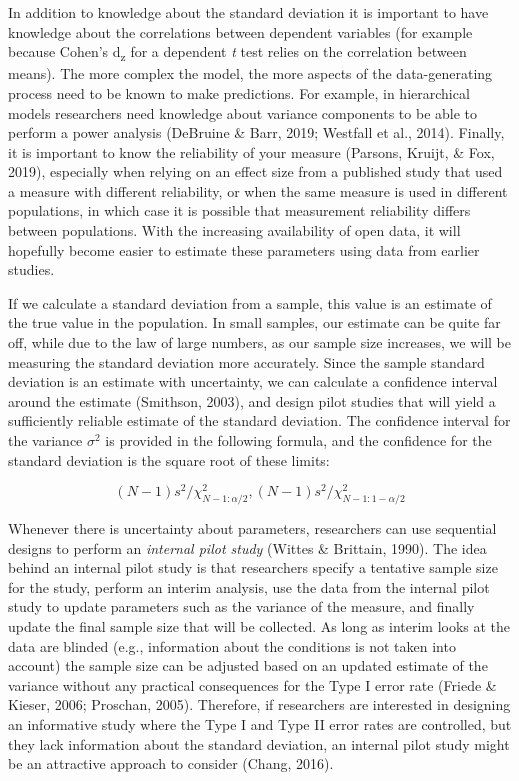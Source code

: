 \documentclass[
  english,
  ,jou, a4paper,floatsintext]{apa6}
\begin{document}
In addition to knowledge about the standard deviation it is important to have knowledge about the correlations between dependent variables (for example because Cohen's d\textsubscript{z} for a dependent \emph{t} test relies on the correlation between means). The more complex the model, the more aspects of the data-generating process need to be known to make predictions. For example, in hierarchical models researchers need knowledge about variance components to be able to perform a power analysis (DeBruine \& Barr, 2019; Westfall et al., 2014). Finally, it is important to know the reliability of your measure (Parsons, Kruijt, \& Fox, 2019), especially when relying on an effect size from a published study that used a measure with different reliability, or when the same measure is used in different populations, in which case it is possible that measurement reliability differs between populations. With the increasing availability of open data, it will hopefully become easier to estimate these parameters using data from earlier studies.

If we calculate a standard deviation from a sample, this value is an estimate of the true value in the population. In small samples, our estimate can be quite far off, while due to the law of large numbers, as our sample size increases, we will be measuring the standard deviation more accurately. Since the sample standard deviation is an estimate with uncertainty, we can calculate a confidence interval around the estimate (Smithson, 2003), and design pilot studies that will yield a sufficiently reliable estimate of the standard deviation. The confidence interval for the variance \(\sigma^2\) is provided in the following formula, and the confidence for the standard deviation is the square root of these limits:

\[(N - 1)s^2/\chi^2_{N-1:\alpha/2},(N - 1)s^2/\chi^2_{N-1:1-\alpha/2}\]

Whenever there is uncertainty about parameters, researchers can use sequential designs to perform an \emph{internal pilot study} (Wittes \& Brittain, 1990). The idea behind an internal pilot study is that researchers specify a tentative sample size for the study, perform an interim analysis, use the data from the internal pilot study to update parameters such as the variance of the measure, and finally update the final sample size that will be collected. As long as interim looks at the data are blinded (e.g., information about the conditions is not taken into account) the sample size can be adjusted based on an updated estimate of the variance without any practical consequences for the Type I error rate (Friede \& Kieser, 2006; Proschan, 2005). Therefore, if researchers are interested in designing an informative study where the Type I and Type II error rates are controlled, but they lack information about the standard deviation, an internal pilot study might be an attractive approach to consider (Chang, 2016).
\end{document}
